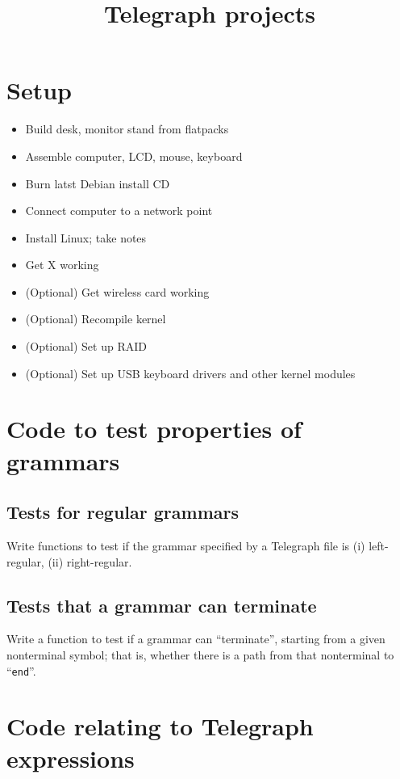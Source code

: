 \documentclass{article}
\begin{document}
\title{Telegraph projects}
\maketitle

\section{Setup}

\begin{itemize}
\item Build desk, monitor stand from flatpacks
\item Assemble computer, LCD, mouse, keyboard
\item Burn latst Debian install CD
\item Connect computer to a network point
\item Install Linux; take notes
\item Get X working
\item (Optional) Get wireless card working
\item (Optional) Recompile kernel
\item (Optional) Set up RAID
\item (Optional) Set up USB keyboard drivers and other kernel modules
\end{itemize}

\section{Code to test properties of grammars}

\subsection{Tests for regular grammars}

Write functions to test if the grammar specified by a Telegraph file
is (i) left-regular, (ii) right-regular.

\subsection{Tests that a grammar can terminate}

Write a function to test if a grammar can ``terminate'',
starting from a given nonterminal symbol;
that is, whether there is a path from that nonterminal to ``{\tt end}''.

\section{Code relating to Telegraph expressions}
\end{document}
